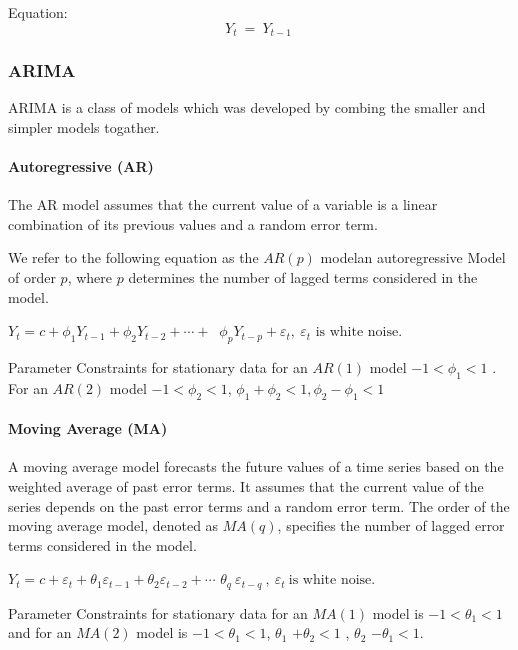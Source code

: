 \documentclass[
]{article}
\begin{document}
Equation: \[ Y_{t}\ = \ Y_{t - 1}\ \]

\hypertarget{arima}{%
\subsubsection{ARIMA}\label{arima}}

ARIMA is a class of models which was developed by combing the smaller
and simpler models togather.

\hypertarget{autoregressive-ar}{%
\paragraph{Autoregressive (AR)}\label{autoregressive-ar}}

The AR model assumes that the current value of a variable is a linear
combination of its previous values and a random error term.

We refer to the following equation as the \(AR(p)\) modelan
autoregressive Model of order \(p\), where \(p\) determines the number
of lagged terms considered in the model.

\(Y_{t} = c + \phi_{1}Y_{t - 1} + \phi_{2}Y_{t - 2} + \cdots +\)
\(\ \phi_{p}Y_{t - p} + \varepsilon_{t} ,\ \varepsilon_{t}\text{ is white noise.}\)

Parameter Constraints for stationary data for an \(AR(1)\) model
\(-1<\phi_{1}<1\) . For an \(AR(2)\) model \(− 1 < \phi_{2} < 1\),
\(\phi_{1}+ \phi_{2}<1 , \phi_{2} − \phi_{1}<1\)

\hypertarget{moving-average-ma}{%
\paragraph{Moving Average (MA)}\label{moving-average-ma}}

A moving average model forecasts the future values of a time series
based on the weighted average of past error terms. It assumes that the
current value of the series depends on the past error terms and a random
error term. The order of the moving average model, denoted as \(MA(q)\),
specifies the number of lagged error terms considered in the model.

\(Y_{t} = c + \varepsilon_{t} + \theta_{1}\varepsilon_{t - 1} + \theta_{2}\varepsilon_{t - 2} + \cdots\)
\(\theta_{q}\ \varepsilon_{t - q}\ ,\ \varepsilon_{t}\ \text{is white noise.}\)

Parameter Constraints for stationary data for an \(MA(1)\) model is
\(-1<\theta_{1}<1\) and for an \(MA(2)\) model is \(-1<\theta_{1}<1\),
\(\theta_{1}\) \(+\theta_{2}<1\) , \(\theta_{2}\) \(-\theta_{1}<1\).
\end{document}
